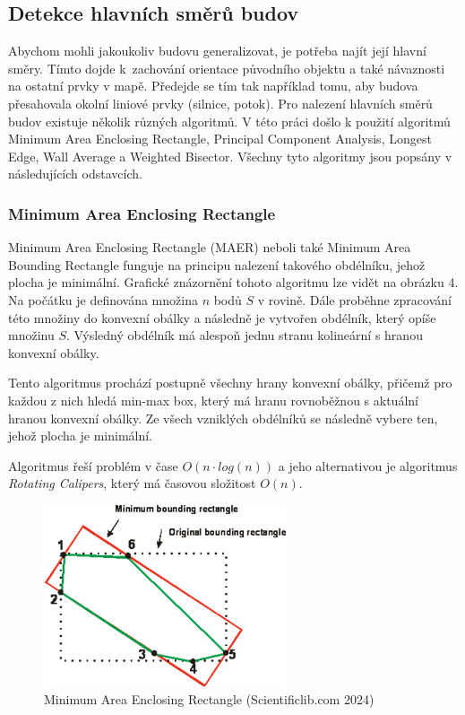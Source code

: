\documentclass{article}
\begin{document}
\begin{spacing}{1.5}
\subsection{Detekce hlavních směrů budov}
Abychom mohli jakoukoliv budovu generalizovat, je potřeba najít její hlavní směry. Tímto dojde k~zachování orientace původního objektu a také návaznosti na ostatní prvky v mapě. Předejde se tím tak například tomu, aby budova přesahovala okolní liniové prvky (silnice, potok). Pro nalezení hlavních směrů budov existuje několik různých algoritmů. V této práci došlo k použití algoritmů Minimum Area Enclosing Rectangle, Principal Component Analysis, Longest Edge, Wall Average a Weighted Bisector. Všechny tyto algoritmy jsou popsány v následujících odstavcích. 

\subsubsection{Minimum Area Enclosing Rectangle}
Minimum Area Enclosing Rectangle (MAER) neboli také Minimum Area Bounding Rectangle funguje na principu nalezení takového obdélníku, jehož plocha je minimální. Grafické znázornění tohoto algoritmu lze vidět na obrázku 4. Na počátku je definována množina $n$ bodů $S$ v rovině. Dále proběhne zpracování této množiny do konvexní obálky a následně je vytvořen obdélník, který opíše množinu $S$. Výsledný obdélník má alespoň jednu stranu kolineární s hranou konvexní obálky.

Tento algoritmus prochází postupně všechny hrany konvexní obálky, přičemž pro každou z nich hledá min-max box, který má hranu rovnoběžnou s aktuální hranou konvexní obálky. Ze všech vzniklých obdélníků se následně vybere ten, jehož plocha je minimální.

Algoritmus řeší problém v čase $O(n\cdot log(n))$ a jeho alternativou je algoritmus \textit{Rotating Calipers}, který má časovou složitost $O(n)$. 

\begin{figure}[h]
    \centering
    \includegraphics[width=0.5\linewidth]{images/maer.png}
    \caption{Minimum Area Enclosing Rectangle (Scientificlib.com 2024)}
    \label{fig:enter-label}
\end{figure}


\end{spacing}
\end{document}
